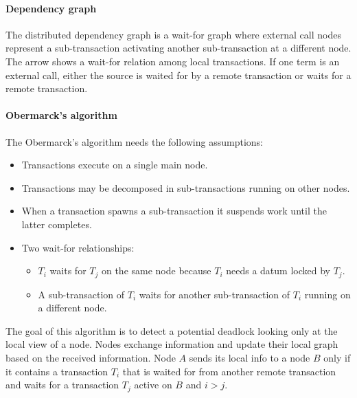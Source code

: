 \paragraph*{Dependency graph}
The distributed dependency graph is a wait-for graph where external call nodes represent a sub-transaction activating another sub-transaction at a different node. 
The arrow shows a wait-for relation among local transactions. 
If one term is an external call, either the source is waited for by a remote transaction or waits for a remote transaction. 

\paragraph*{Obermarck's algorithm}
The Obermarck's algorithm needs the following assumptions: 
\begin{itemize}
    \item Transactions execute on a single main node. 
    \item Transactions may be decomposed in sub-transactions running on other nodes. 
    \item When a transaction spawns a sub-transaction it suspends work until the latter completes. 
    \item Two wait-for relationships:
        \begin{itemize}
            \item $T_i$ waits for $T_j$ on the same node because $T_i$ needs a datum locked by $T_j$. 
            \item A sub-transaction of $T_i$ waits for another sub-transaction of $T_i$ running on a different node. 
        \end{itemize}
\end{itemize}
The goal of this algorithm is to detect a potential deadlock looking only at the local view of a node. 
Nodes exchange information and update their local graph based on the received information. 
Node $A$ sends its local info to a node $B$ only if it contains a transaction $T_i$ that is waited for from another remote transaction and waits for a transaction $T_j$ active on $B$ and $i>j$.
